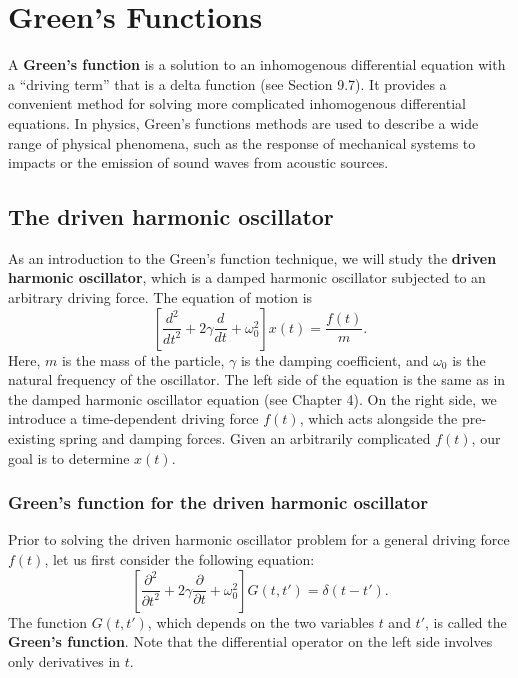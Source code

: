 \documentclass[10pt,a4paper]{article}
\begin{document}
\setcounter{page}{86}

\section{Green's Functions}
\label{greens-functions}

A \textbf{Green's function} is a solution to an inhomogenous
differential equation with a ``driving term'' that is a delta function
(see Section 9.7). It provides a convenient method for solving more
complicated inhomogenous differential equations. In physics, Green's
functions methods are used to describe a wide range of physical
phenomena, such as the response of mechanical systems to impacts or
the emission of sound waves from acoustic sources.

\subsection{The driven harmonic oscillator}
\label{the-driven-harmonic-oscillator}

As an introduction to the Green's function technique, we will study
the \textbf{driven harmonic oscillator}, which is a damped harmonic
oscillator subjected to an arbitrary driving force.  The equation of
motion is
\begin{equation}
\left[\frac{d^2}{dt^2} + 2 \gamma \frac{d}{dt} + \omega_0^2\right] x(t) = \frac{f(t)}{m}.
\end{equation}
Here, $m$ is the mass of the particle, $\gamma$ is the damping
coefficient, and $\omega_0$ is the natural frequency of the
oscillator. The left side of the equation is the same as in the damped
harmonic oscillator equation (see Chapter 4). On the right side, we
introduce a time-dependent driving force $f(t)$, which acts alongside
the pre-existing spring and damping forces. Given an arbitrarily
complicated $f(t)$, our goal is to determine $x(t)$.

\subsubsection{Green's function for the driven harmonic oscillator}
\label{greens-function-for-the-driven-harmonic-oscillator}

Prior to solving the driven harmonic oscillator problem for a general
driving force $f(t)$, let us first consider the following equation:
\begin{equation}
\left[\frac{\partial^2}{\partial t^2} + 2 \gamma \frac{\partial}{\partial t} + \omega_0^2\right] G(t, t') = \delta(t-t').
\label{greenfuneq}
\end{equation}
The function $G(t,t')$, which depends on the two variables $t$ and
$t'$, is called the \textbf{Green's function}. Note that the
differential operator on the left side involves only derivatives in
$t$.
\end{document}
